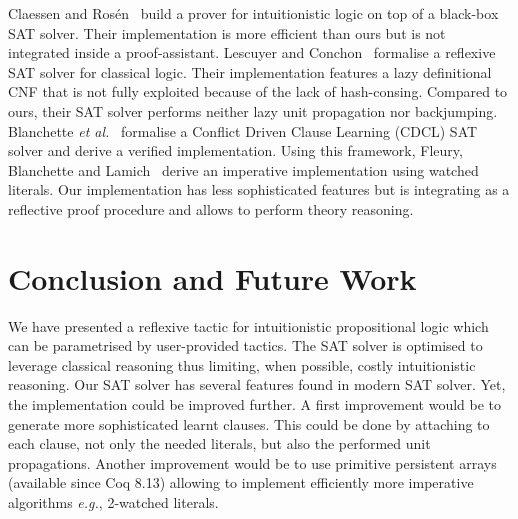 \documentclass[utf8,a4paper,UKenglish,cleveref, autoref, thm-restate]{lipics-v2021}
\begin{document}
Claessen and Ros{\'{e}}n~\cite{ClaessenR15} build a prover for
intuitionistic logic on top of a black-box SAT solver. Their
implementation is more efficient than ours but is not integrated
inside a proof-assistant. 
% 
Lescuyer and
Conchon~\cite{lescuyer08tphol,LescuyerC09} formalise a reflexive SAT
solver for classical logic. Their implementation features a lazy
definitional CNF that is not fully exploited because of the lack of
hash-consing. Compared to ours, their SAT solver performs neither lazy
unit propagation nor backjumping.
%
Blanchette \emph{et al.}~\cite{BlanchetteFLW18} formalise a Conflict
Driven Clause Learning (CDCL) SAT solver and derive a verified
implementation. Using this framework, Fleury, Blanchette and
Lamich~\cite{FleuryBL18} derive an imperative implementation using
watched literals. Our implementation has less sophisticated features
but is integrating as a reflective proof procedure and allows to
perform theory reasoning.



\section{Conclusion and Future Work}
\label{sec:conclusion}

We have presented  a reflexive tactic for intuitionistic
propositional logic which can be parametrised by user-provided tactics.
%
The SAT solver is optimised to leverage classical reasoning thus limiting, when possible, costly intuitionistic reasoning.
%
Our SAT solver has several features found in modern SAT solver. Yet,
the implementation could be improved further. A first improvement
would be to generate more sophisticated learnt clauses. This could be
done by attaching to each clause, not only the needed literals, but
also the performed unit propagations. Another improvement would
be to use primitive persistent arrays (available since Coq 8.13)
allowing to implement efficiently more imperative algorithms
\emph{e.g.},  2-watched literals.





\end{document}
